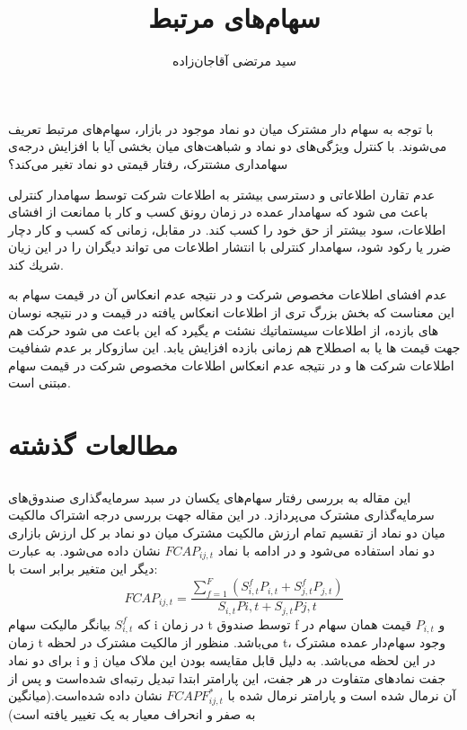 \documentclass[12pt]{article}
\begin{document}
\title{سهام‌های مرتبط}
\author{سید مرتضی آقاجان‌زاده}
\maketitle

با توجه به سهام دار مشترک میان دو نماد موجود در بازار، سهام‌های مرتبط تعریف می‌شوند. با کنترل ویژگی‌های دو نماد و شباهت‌های میان بخشی آیا با افزایش درجه‌ی سهامداری مشتترک، رفتار قیمتی دو نماد تغیر می‌کند؟ 

عدم تقارن اطلاعاتی و دسترسی بیشتر به اطلاعات شركت توسط سهامدار كنترلی
باعث می شود كه سهامدار عمده در زمان رونق كسب و كار با ممانعت از افشای اطلاعات، سود بیشتر از حق خود را كسب
كند. در مقابل، زمانی كه كسب و كار دچار ضرر یا ركود شود، سهامدار كنترلی با انتشار اطلاعات می تواند دیگران را در این
زیان شریك كند.

عدم افشای اطلاعات مخصوص شركت و در نتیجه عدم انعكاس آن در قیمت سهام به این معناست كه بخش
بزرگ تری از اطلاعات انعكاس یافته در قیمت و در نتیجه نوسان های بازده، از اطلاعات سیستماتیك نشئت م یگیرد كه
این باعث می شود حركت هم جهت قیمت ها یا به اصطلاح هم زمانی  بازده افزایش یابد. این سازوكار بر عدم شفافیت
اطلاعات شركت ها و در نتیجه عدم انعكاس اطلاعات مخصوص شركت در قیمت سهام مبتنی است.
\section{مطالعات گذشته}
\subsection{}
این مقاله به بررسی رفتار سهام‌های یکسان در سبد سرمایه‌گذاری صندوق‌های سرمایه‌گذاری مشترک می‌پردازد. در این مقاله جهت بررسی درجه اشتراک مالکیت میان دو نماد از  تقسیم تمام ارزش مالکیت مشترک میان دو نماد بر کل ارزش بازاری دو نماد استفاده می‌شود و در ادامه با نماد $ FCAP_{ij,t} $ نشان داده می‌شود. به عبارت دیگر این متغیر برابر است با:
\begin{equation}
 FCAP_{ij,t} = \frac{\sum_{f = 1}^{F} (S^f_{i,t}P_{i,t}+S^f_{j,t}P_{j,t})}{S_{i,t}P{i,t} + S_{j,t}P{j,t}} 
 \label{e2}
\end{equation}
 که 
 $ S^f_{i,t} $
 بیانگر مالیکت سهام i در زمان t توسط صندوق f و
  $ P_{i,t}$
  قیمت همان سهام در زمان t می‌باشد. 
  منظور از مالکیت مشترک در لحظه t، وجود سهام‌دار عمده مشترک برای دو نماد i و j در این لحظه می‌باشد. به دلیل قابل مقایسه بودن این ملاک میان جفت نماد‌های متفاوت در هر جفت، این پارامتر ابتدا تبدیل رتبه‌ای
   شده‌است و پس از آن نرمال شده است و پارامتر نرمال شده با $ FCAPF^*_{ij,t} $ نشان داده شده‌است.(میانگین به صفر و انحراف معیار به یک تغییر یافته است) 
  
\end{document}

